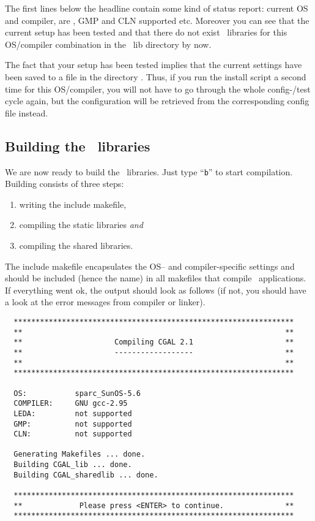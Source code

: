 The first lines below the headline contain some kind of status report:
current OS and compiler, are \leda, GMP and CLN supported etc.
Moreover you can see that the current setup has been tested and that
there do not exist \cgal\ libraries for this OS/compiler combination
in the \cgal\ lib directory by now.

The fact that your setup has been tested implies that the current
settings have been saved to a file in the directory \cgalinstconfdir.
Thus, if you run the install script a second time for this
OS/compiler, you will not have to go through the whole config-/test
cycle again, but the configuration will be retrieved from the
corresponding config file instead.

\subsection{Building the \cgal\ libraries}\label{sec:build-the-libs}

We are now ready to build the \cgal\ libraries.  Just type ``{\tt b}''
to start compilation. Building consists of three steps:
\begin{enumerate}
\item writing the include makefile,
\item compiling the static libraries \textit{and}
\item compiling the shared libraries.
\end{enumerate}
The include makefile encapsulates the OS-- and compiler-specific
settings and should be included (hence the name) in all makefiles that
compile \cgal\ applications. If everything went ok, the output should
look as follows (if not, you should have a look at the error messages
from compiler or linker).

{\ccTexHtml{\scriptsize}{}
\begin{verbatim}
  ****************************************************************
  **                                                            **
  **                     Compiling CGAL 2.1                     **
  **                     ------------------                     **
  **                                                            **
  ****************************************************************

  OS:           sparc_SunOS-5.6
  COMPILER:     GNU gcc-2.95
  LEDA:         not supported
  GMP:          not supported
  CLN:          not supported

  Generating Makefiles ... done.
  Building CGAL_lib ... done.
  Building CGAL_sharedlib ... done.

  ****************************************************************
  **             Please press <ENTER> to continue.              **
  ****************************************************************
\end{verbatim}}
  
